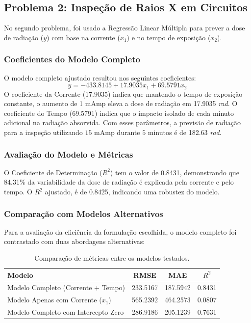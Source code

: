 \documentclass{article}
\begin{document}
\subsection{Problema 2: Inspeção de Raios X em Circuitos}
No segundo problema, foi usado a Regressão Linear Múltipla para prever a dose de radiação ($y$) com base na corrente ($x_1$) e no tempo de exposição ($x_2$).

\subsubsection{Coeficientes do Modelo Completo}
O modelo completo ajustado resultou nos seguintes coeficientes:
\begin{equation}
    y = -433.8145 + 17.9035x_1 + 69.5791x_2
\end{equation}
O coeficiente da Corrente (17.9035) indica que mantendo o tempo de exposição constante, o aumento de 1 mAmp eleva a dose de radiação em 17.9035 \textit{rad}. O coeficiente do Tempo (69.5791) indica que o impacto isolado de cada minuto adicional na radiação absorvida. Com esses parâmetros, a previsão de radiação para a inspeção utilizando $15$ mAmp durante $5$ minutos é de 182.63 \textit{rad}.

\subsubsection{Avaliação do Modelo e Métricas}
O Coeficiente de Determinação ($R^2$) tem o valor de 0.8431, demonstrando que 84.31\% da variabilidade da dose de radiação é explicada pela corrente e pelo tempo. O $R^2$ ajustado, é de 0.8425, indicando uma robustez do modelo.

\subsubsection{Comparação com Modelos Alternativos}
Para a avaliação da eficiência da formulação escolhida, o modelo completo foi contrastado com duas abordagens alternativas:
\begin{table}[H]
\centering
\begin{tabular}{|l|c|c|c|}
\hline
\textbf{Modelo} & \textbf{RMSE} & \textbf{MAE} & \textbf{$R^2$} \\ \hline
Modelo Completo (Corrente + Tempo) & 233.5167 & 187.5942 & 0.8431 \\ \hline
Modelo Apenas com Corrente ($x_1$) & 565.2392 & 464.2573 & 0.0807 \\ \hline
Modelo Completo com Intercepto Zero & 286.9186 & 205.1239 & 0.7631 \\ \hline
\end{tabular}
\caption{Comparação de métricas entre os modelos testados.}
\label{tab:comparacao_modelos}
\end{table}
\end{document}
